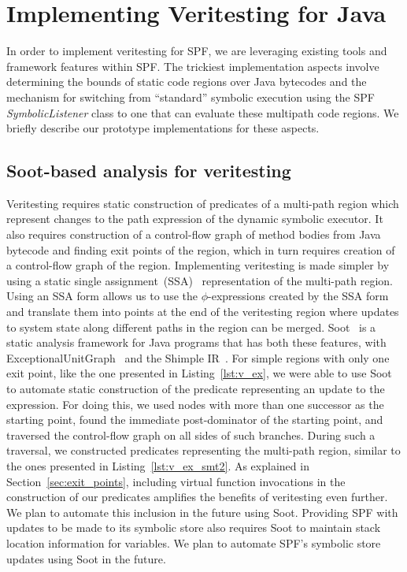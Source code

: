\section{Implementing Veritesting for Java}
In order to implement veritesting for SPF, we are leveraging existing tools and framework features within SPF.  The trickiest implementation aspects involve determining the bounds of static code regions over Java bytecodes and the mechanism for switching from ``standard'' symbolic execution using the SPF {\em SymbolicListener} class to one that can evaluate these multipath code regions. We briefly describe our prototype implementations for these aspects.
%
\subsection{Soot-based analysis for veritesting}
%
Veritesting requires static construction of
predicates of a multi-path region which represent changes to the path expression of the dynamic
symbolic executor.
%
It also requires construction of a control-flow graph of method bodies
from Java bytecode and finding exit points of the region, which in turn
requires creation of a control-flow graph of the region.
%
Implementing veritesting is made simpler by using a static single
assignment~(SSA)~\cite{ssa} representation of the multi-path region.
%
Using an SSA form allows us to use the $\phi$-expressions created by the
SSA form and translate them into points at the end of the veritesting
region where updates to system state along different paths in the region
can be merged.
%
Soot~\cite{soot} is a static analysis framework for Java programs that
has both these features, with
ExceptionalUnitGraph~\cite{exceptionalunitgraph} and the Shimple
IR~\cite{shimple}.
%
For simple regions with only one exit point, like the one presented in Listing~\ref{lst:v_ex}, we
were able to use Soot to automate static construction of the predicate representing
an update to the expression.
%
For doing this, we used nodes with more than one successor as the
starting point, found the immediate post-dominator of the starting
point, and traversed the control-flow graph on all sides of such branches.
%
During such a traversal, we constructed predicates representing the
multi-path region, similar to the ones presented in
Listing~\ref{lst:v_ex_smt2}.
%
As explained in Section~\ref{sec:exit_points}, including virtual
function invocations in the construction of our predicates amplifies the
benefits of veritesting even further.
%
We plan to automate this inclusion in the future using Soot.
%
Providing SPF with updates to be made to its symbolic store also
requires Soot to maintain stack location information for variables.
%
We plan to automate SPF\rq s symbolic store updates using Soot in the
future.
%
